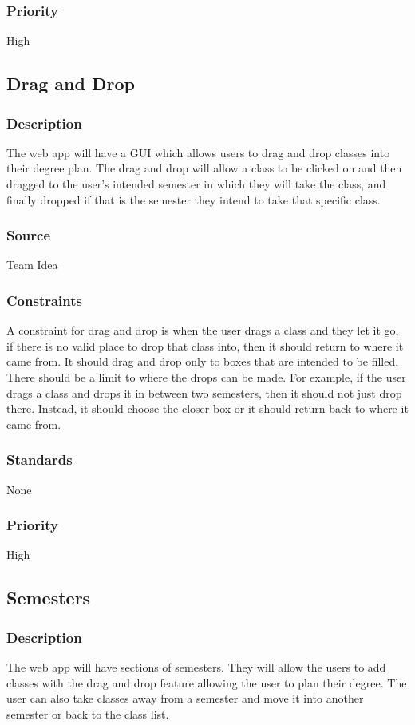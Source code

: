 \subsubsection{Priority}
High

\subsection{Drag and Drop}
\subsubsection{Description}
The web app will have a GUI which allows users to drag and drop classes into their degree plan. The drag and drop will allow a class to be clicked on and then dragged to the user's intended semester in which they will take the class, and finally dropped if that is the semester they intend to take that specific class.
\subsubsection{Source}
Team Idea
\subsubsection{Constraints}
A constraint for drag and drop is when the user drags a class and they let it go, if there is no valid place to drop that class into, then it should return to where it came from. It should drag and drop only to boxes that are intended to be filled. There should be a limit to where the drops can be made. For example, if the user drags a class and drops it in between two semesters, then it should not just drop there. Instead, it should choose the closer box or it should return back to where it came from. 
\subsubsection{Standards}
None
\subsubsection{Priority}
High

\subsection{Semesters}
\subsubsection{Description}
The web app will have sections of semesters. They will allow the users to add classes with the drag and drop feature allowing the user to plan their degree. The user can also take classes away from a semester and move it into another semester or back to the class list. 
